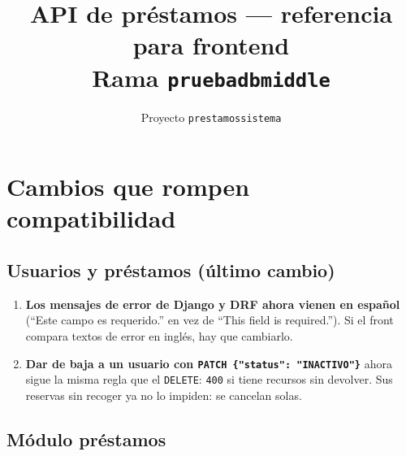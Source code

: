 \documentclass[11pt]{article}
\title{API de pr\'estamos --- referencia para frontend\\\large Rama \texttt{prueba\us db\us middle}}
\author{Proyecto \texttt{prestamos\us sistema}}
\date{}
\begin{document}
\maketitle

\section{Cambios que rompen compatibilidad}

\subsection*{Usuarios y pr\'estamos (\'ultimo cambio)}

\begin{enumerate}
    \item \textbf{Los mensajes de error de Django y DRF ahora vienen en espa\~nol} (\textquotedblleft Este campo es requerido.\textquotedblright{} en vez de \textquotedblleft This field is required.\textquotedblright). Si el front compara textos de error en ingl\'es, hay que cambiarlo.
    \item \textbf{Dar de baja a un usuario con \texttt{PATCH \{"status": "INACTIVO"\}}} ahora sigue la misma regla que el \texttt{DELETE}: \texttt{400} si tiene recursos sin devolver. Sus reservas sin recoger ya no lo impiden: se cancelan solas.
\end{enumerate}

\subsection*{M\'odulo pr\'estamos}
\end{document}
